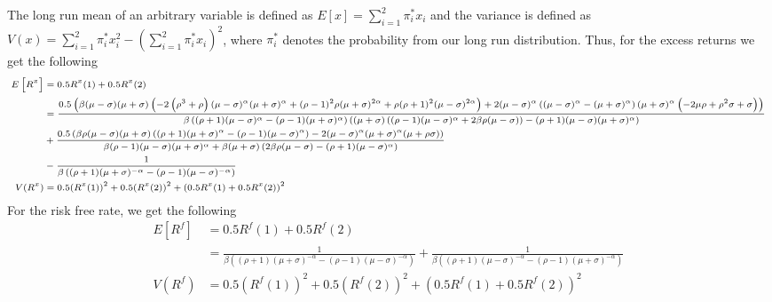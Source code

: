 \documentclass[french]{article}
\begin{document}
\begin{enumerate}[I]
	The long run mean of an arbitrary variable is defined as $E\left[x\right] = \sum_{i=1}^{2}\pi_i^*x_i$ and the variance is defined as $V(x) =  \sum_{i=1}^{2}\pi_i^*x_i^2 - (\sum_{i=1}^{2}\pi_i^*x_i)^2$, where $\pi_i^*$ denotes the probability from our long run distribution. Thus, for the excess returns we get the following
	\begin{equation*}
	{\scriptsize
	\begin{split}
		E\left[R^x\right] &= 0.5 R^x(1) + 0.5 R^x(2)\\
		&= \frac{0.5 \left(\beta  (\mu -\sigma ) (\mu +\sigma )
			\left(-2 \left(\rho ^3+\rho \right) (\mu -\sigma
			)^{\alpha } (\mu +\sigma )^{\alpha }+(\rho -1)^2
			\rho  (\mu +\sigma )^{2 \alpha }+\rho  (\rho +1)^2
			(\mu -\sigma )^{2 \alpha }\right)+2 (\mu -\sigma
			)^{\alpha } \left((\mu -\sigma )^{\alpha }-(\mu
			+\sigma )^{\alpha }\right) (\mu +\sigma )^{\alpha }
			\left(-2 \mu  \rho +\rho ^2 \sigma +\sigma
			\right)\right)}{\beta  \left((\rho +1) (\mu -\sigma
			)^{\alpha }-(\rho -1) (\mu +\sigma )^{\alpha
			}\right) \left((\mu +\sigma ) \left((\rho -1) (\mu
			-\sigma )^{\alpha }+2 \beta  \rho  (\mu -\sigma
			)\right)-(\rho +1) (\mu -\sigma ) (\mu +\sigma
			)^{\alpha }\right)}\\
		&+\frac{0.5 \left(\beta  \rho 
			(\mu -\sigma ) (\mu +\sigma ) \left((\rho +1) (\mu
			+\sigma )^{\alpha }-(\rho -1) (\mu -\sigma
			)^{\alpha }\right)-2 (\mu -\sigma )^{\alpha } (\mu
			+\sigma )^{\alpha } (\mu +\rho  \sigma
			)\right)}{\beta  (\rho -1) (\mu -\sigma ) (\mu
			+\sigma )^{\alpha }+\beta  (\mu +\sigma ) \left(2
			\beta  \rho  (\mu -\sigma )-(\rho +1) (\mu -\sigma
			)^{\alpha }\right)}\\
		&-\frac{1}{\beta  \left((\rho
			+1) (\mu +\sigma )^{-\alpha }-(\rho -1) (\mu
			-\sigma )^{-\alpha }\right)}\\
		V(R^x) &=  0.5 (R^x(1))^2 + 0.5 (R^x(2))^2 +  (0.5 R^x(1) + 0.5 R^x(2))^2\\
	\end{split}
}
	\end{equation*}
   For the risk free rate, we get the following
   	\begin{equation*}
	   \begin{split}
	   E\left[R^f\right] &= 0.5 R^f(1) + 0.5 R^f(2)\\
	   &=\frac{1}{\beta  \left((\rho +1) (\mu +\sigma
	   	)^{-\alpha }-(\rho -1) (\mu -\sigma )^{-\alpha
	   	}\right)}+\frac{1}{\beta  \left((\rho +1) (\mu
	   	-\sigma )^{-\alpha }-(\rho -1) (\mu +\sigma
	   	)^{-\alpha }\right)}\\
	   V(R^f) &=  0.5 (R^f(1))^2 + 0.5 (R^f(2))^2 +  (0.5 R^f(1) + 0.5 R^f(2))^2\\	
	   \end{split}
   \end{equation*}
   

\end{enumerate}
\end{document}
